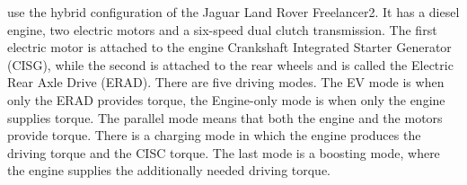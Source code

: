 
\citet{dextreit2014game} use the hybrid configuration of the Jaguar Land Rover Freelancer2. It has a diesel engine, two electric motors and a six-speed dual clutch transmission. The first electric motor is attached to the engine Crankshaft Integrated Starter Generator (CISG), while the second is attached to the rear wheels and is called the Electric Rear Axle Drive (ERAD). There are five driving modes. The EV mode is when only the ERAD provides torque, the Engine-only mode is when only the engine supplies torque. The parallel mode means that both the engine and the motors provide torque. There is a charging mode in which the engine produces the driving torque and the CISC torque. The last mode is a boosting mode, where the engine supplies the additionally needed driving torque.

